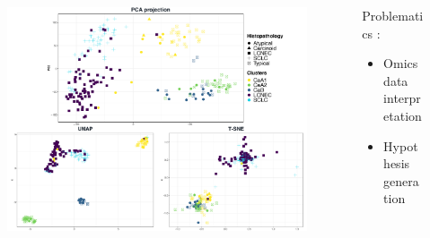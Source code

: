 \documentclass[compress]{beamer}
\begin{document}
\begin{frame}
\begin{overprint}
    \begin{columns}[c]
  \begin{column}{0.75\linewidth}
    \vspace*{-0.4cm}
  \begin{figure}
\centering
\includegraphics[height=0.75\linewidth]{figures/intro/RD3.pdf}
  \end{figure}
  \end{column}
  \hspace{-0.7cm}

  \begin{column}{0.25\linewidth}

  \hskip8pt 
    \textcolor{IARCblue}{Problematics : }
  \begin{itemize}
        \item Omics data interpretation
      \item Hypothesis generation 
  \end{itemize}
  \end{column}
 \end{columns} 
  
        

\end{overprint}
\end{frame}
\end{document}
